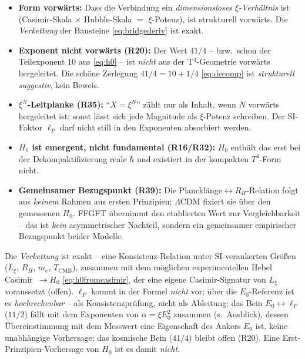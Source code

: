 \begin{warningboxenv}
\begin{itemize}
  \item \textbf{Form vorwärts:} Dass die Verbindung ein \emph{dimensionsloses
        $\xi$-Verhältnis} ist (Casimir-Skala $\times$ Hubble-Skala $=$
        $\xi$-Potenz), ist strukturell vorwärts. Die \emph{Verkettung} der
        Bausteine \eqref{eq:bridgederiv} ist exakt.
  \item \textbf{Exponent nicht vorwärts (R20):} Der Wert $41/4$ -- bzw.\ schon
        der Teilexponent $10$ aus \eqref{eq:h0} -- ist \emph{nicht} aus der
        T$^4$-Geometrie vorwärts hergeleitet. Die schöne Zerlegung
        $41/4=10+1/4$ \eqref{eq:decomp} ist \emph{strukturell suggestiv}, kein
        Beweis.
  \item \textbf{$\xi^N$-Leitplanke (R35):} ``$X=\xi^N$'' zählt nur als Inhalt,
        wenn $N$ vorwärts hergeleitet ist; sonst lässt sich jede Magnitude als
        $\xi$-Potenz schreiben. Der SI-Faktor $\ell_P$ darf nicht still in den
        Exponenten absorbiert werden.
  \item \textbf{$H_0$ ist emergent, nicht fundamental (R16/R32):} $H_0$ enthält
        das erst bei der Dekompaktifizierung reale $\hbar$ und existiert in der
        kompakten $T^4$-Form nicht.
  \item \textbf{Gemeinsamer Bezugspunkt (R39):} Die Plancklänge$\leftrightarrow
        R_H$-Relation folgt aus \emph{keinem} Rahmen aus ersten Prinzipien;
        $\Lambda$CDM fixiert sie über den gemessenen $H_0$. FFGFT übernimmt den
        etablierten Wert zur Vergleichbarkeit -- das ist \emph{kein}
        asymmetrischer Nachteil, sondern ein gemeinsamer empirischer
        Bezugspunkt beider Modelle.
\end{itemize}
\end{warningboxenv}

\begin{foundation}
Die \emph{Verkettung} ist exakt -- eine Konsistenz-Relation unter SI-verankerten
Größen ($L_\xi$, $R_H$, $m_e$, $T_\text{CMB}$), zusammen mit dem möglichen
experimentellen Hebel Casimir~$\to H_0$ \eqref{eq:h0fromcasimir}, der eine
eigene Casimir-Signatur von $L_\xi$ voraussetzt (offen). $\ell_P$ kommt in der Formel
\emph{nicht} vor; über die $E_0$-Referenz ist es \emph{hochrechenbar} -- als
Konsistenzprüfung, nicht als Ableitung: das Bein $E_0\leftrightarrow\ell_P$
($11/2$) fällt mit dem Exponenten von $\alpha=\xi E_0^2$ zusammen (s.\ Ausblick),
dessen Übereinstimmung mit dem Messwert eine Eigenschaft des Ankers $E_0$ ist,
keine unabhängige Vorhersage; das kosmische Bein ($41/4$) bleibt offen (R20). Eine Erst-Prinzipien-Vorhersage von $H_0$ ist
es damit \emph{nicht}.
\end{foundation}

